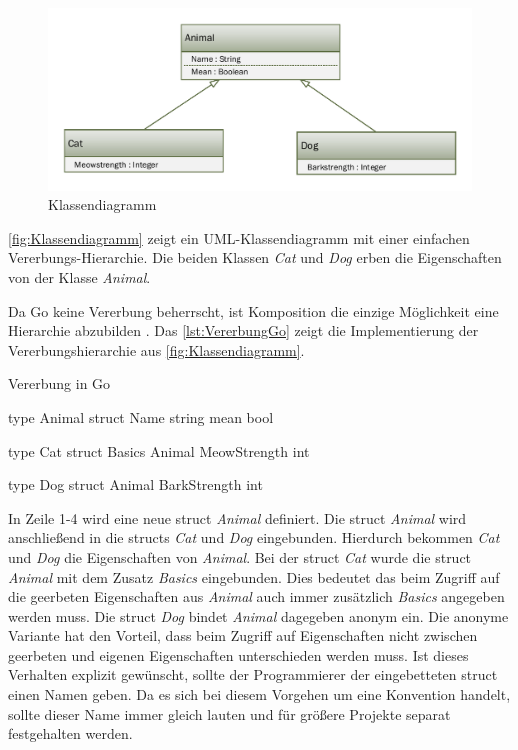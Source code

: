 \begin{figure}[H]
    \centering
    \includegraphics[width=\textwidth]{Images/Klassendiagramm.pdf}
    \caption{Klassendiagramm}
    \label{fig:Klassendiagramm}
\end{figure}

\autoref{fig:Klassendiagramm} zeigt ein UML-Klassendiagramm mit einer einfachen Vererbungs-Hierarchie.
Die beiden Klassen \emph{Cat} und \emph{Dog} erben die Eigenschaften von der Klasse \emph{Animal}.


Da Go keine Vererbung beherrscht, ist Komposition die einzige Möglichkeit eine Hierarchie abzubilden \cite[]{Kennedy.2016}.
Das \autoref{lst:VererbungGo} zeigt die Implementierung der Vererbungshierarchie aus \autoref{fig:Klassendiagramm}.

\begin{listing}[H]
\caption{Vererbung in Go \cite{Kennedy.2016}}
\label{lst:VererbungGo}
\begin{GoCode}
type Animal struct {
    Name string
    mean bool
}

type Cat struct {
    Basics Animal
    MeowStrength int
}

type Dog struct {
    Animal
    BarkStrength int
}
\end{GoCode}
\end{listing}

In Zeile 1-4 wird eine neue struct \emph{Animal} definiert.
Die struct \emph{Animal} wird anschließend in die structs \emph{Cat} und \emph{Dog} eingebunden. 
Hierdurch bekommen \emph{Cat} und \emph{Dog} die Eigenschaften von \emph{Animal}.
Bei der struct \emph{Cat} wurde die struct \emph{Animal} mit dem Zusatz \emph{Basics} eingebunden. 
Dies bedeutet das beim Zugriff auf die geerbeten Eigenschaften aus \emph{Animal} auch immer zusätzlich \emph{Basics} angegeben werden muss. 
Die struct \emph{Dog} bindet \emph{Animal} dagegeben anonym ein. 
Die anonyme Variante hat den Vorteil, dass beim Zugriff auf Eigenschaften nicht zwischen geerbeten und eigenen Eigenschaften unterschieden werden muss.
Ist dieses Verhalten explizit gewünscht, sollte der Programmierer der eingebetteten struct einen Namen geben.
Da es sich bei diesem Vorgehen um eine Konvention handelt, sollte dieser Name immer gleich lauten und für größere Projekte separat festgehalten werden. 

